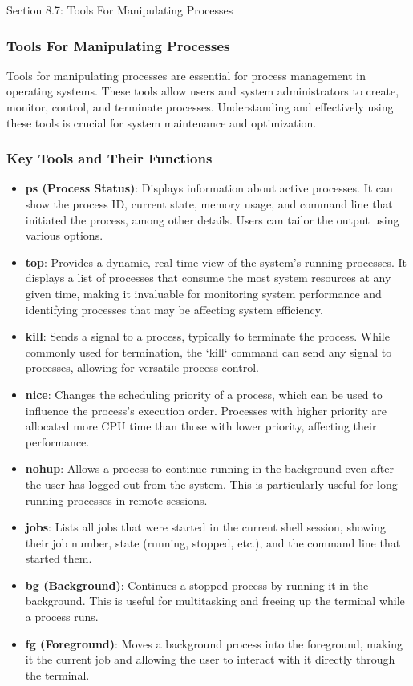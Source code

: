 \begin{notes}{Section 8.7: Tools For Manipulating Processes}
    \subsubsection*{Tools For Manipulating Processes}

    Tools for manipulating processes are essential for process management in operating systems. These tools allow users and system administrators to create, monitor, control, and terminate processes. 
    Understanding and effectively using these tools is crucial for system maintenance and optimization. \vspace*{1em}
    
    \subsubsection*{Key Tools and Their Functions}
    
    \begin{itemize}
        \item \textbf{ps (Process Status)}: Displays information about active processes. It can show the process ID, current state, memory usage, and command line that initiated the process, among 
        other details. Users can tailor the output using various options.
        \item \textbf{top}: Provides a dynamic, real-time view of the system's running processes. It displays a list of processes that consume the most system resources at any given time, making it 
        invaluable for monitoring system performance and identifying processes that may be affecting system efficiency.
        \item \textbf{kill}: Sends a signal to a process, typically to terminate the process. While commonly used for termination, the `kill` command can send any signal to processes, allowing for 
        versatile process control.
        \item \textbf{nice}: Changes the scheduling priority of a process, which can be used to influence the process's execution order. Processes with higher priority are allocated more CPU time 
        than those with lower priority, affecting their performance.
        \item \textbf{nohup}: Allows a process to continue running in the background even after the user has logged out from the system. This is particularly useful for long-running processes in remote sessions.
        \item \textbf{jobs}: Lists all jobs that were started in the current shell session, showing their job number, state (running, stopped, etc.), and the command line that started them.
        \item \textbf{bg (Background)}: Continues a stopped process by running it in the background. This is useful for multitasking and freeing up the terminal while a process runs.
        \item \textbf{fg (Foreground)}: Moves a background process into the foreground, making it the current job and allowing the user to interact with it directly through the terminal.
    \end{itemize}
    

\end{notes}

